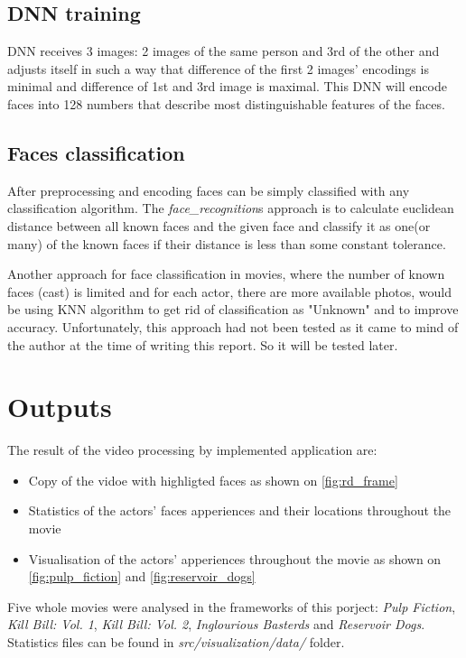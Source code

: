 \documentclass[hidelinks, english]{mvi-report}
\begin{document}
\subsection{DNN training}
DNN receives 3 images: 2 images of the same person and 3rd of the other and adjusts itself in such a way that
difference of the first 2 images' encodings is minimal and difference of 1st and 3rd image is maximal. This DNN will
encode faces into 128 numbers that describe most distinguishable features of the faces.

\subsection{Faces classification}\label{sub:classification}
After preprocessing and encoding faces can be simply classified with any classification algorithm.
The \textit{face\_recognition}s approach is to calculate euclidean distance between all known faces and the given
face and classify it as one(or many) of the known faces if their distance is less than some constant tolerance.

Another approach for face classification in movies, where the number of known faces (cast) is limited and for each
actor, there are more available photos, would be using KNN algorithm to get rid of classification as "Unknown" and to
improve accuracy. Unfortunately, this approach had not been tested as it came to mind of the author at the time of
writing this report. So it will be tested later.

\section{Outputs}

The result of the video processing by implemented application are:

\begin{itemize}
    \item Copy of the vidoe with highligted faces as shown on \cref{fig:rd_frame}
    \item Statistics of the actors' faces apperiences and their locations throughout the movie
    \item Visualisation of the actors' apperiences throughout the movie as shown on \cref{fig:pulp_fiction} and
    \cref{fig:reservoir_dogs}
\end{itemize}

Five whole movies were analysed in the frameworks of this porject: \textit{Pulp Fiction}, \textit{Kill Bill: Vol. 1},
\textit{Kill Bill: Vol. 2}, \textit{Inglourious Basterds} and \textit{Reservoir Dogs}. Statistics files can be found in
\textit{src/visualization/data/} folder.
\end{document}
